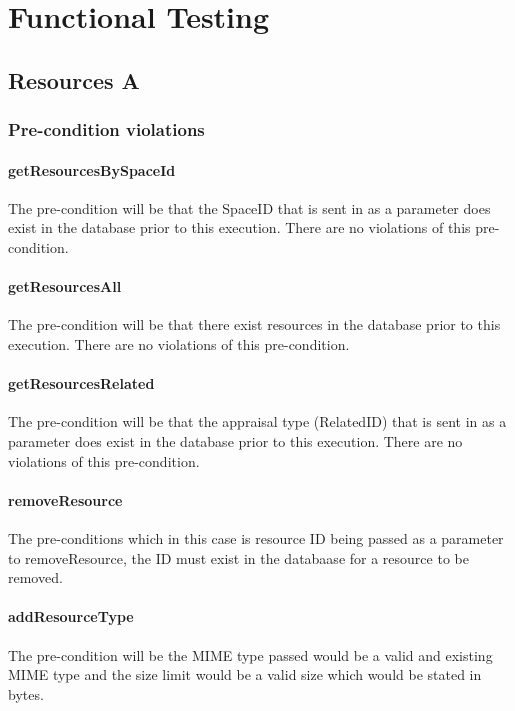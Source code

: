 \documentclass[a4paper]{article}
\begin{document}
\section {Functional Testing}

\subsection {Resources A}
\subsubsection {Pre-condition violations}

\paragraph{getResourcesBySpaceId}
The pre-condition will be that the SpaceID that is sent in as a parameter does exist in the database prior to this execution. There are no violations of this pre-condition.

\paragraph{getResourcesAll}
The pre-condition will be that there exist resources in the database prior to this execution. There are no violations of this pre-condition.

\paragraph{getResourcesRelated}
The pre-condition will be that the appraisal type (RelatedID) that is sent in as a parameter does exist in the database prior to this execution. There are no violations of this pre-condition. 

\paragraph{removeResource}
The pre-conditions which in this case is resource ID being passed as a parameter to removeResource, the ID must exist in the databaase for a resource to be removed.

\paragraph{addResourceType}
The pre-condition will be the MIME type passed would be a valid and existing MIME type and the size limit would be a valid size which would be stated in bytes.
\end{document}
